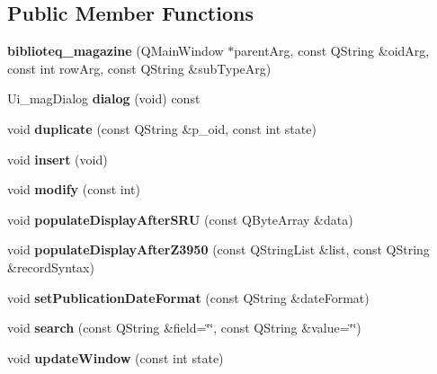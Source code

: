 \subsection*{Public Member Functions}
\begin{DoxyCompactItemize}
\item 
{\bfseries biblioteq\+\_\+magazine} (Q\+Main\+Window $\ast$parent\+Arg, const Q\+String \&oid\+Arg, const int row\+Arg, const Q\+String \&sub\+Type\+Arg)\hypertarget{classbiblioteq__magazine_ad28113019caa57b7ee667a82516b7bef}{}\label{classbiblioteq__magazine_ad28113019caa57b7ee667a82516b7bef}

\item 
Ui\+\_\+mag\+Dialog {\bfseries dialog} (void) const \hypertarget{classbiblioteq__magazine_aefc3cf7d5dc6f2af91040d8ba681b6f3}{}\label{classbiblioteq__magazine_aefc3cf7d5dc6f2af91040d8ba681b6f3}

\item 
void {\bfseries duplicate} (const Q\+String \&p\+\_\+oid, const int state)\hypertarget{classbiblioteq__magazine_ac02b6ebcb65686082f8fb3ffa411288d}{}\label{classbiblioteq__magazine_ac02b6ebcb65686082f8fb3ffa411288d}

\item 
void {\bfseries insert} (void)\hypertarget{classbiblioteq__magazine_a28d4da5cc33f6ac02373b85dfe4240b7}{}\label{classbiblioteq__magazine_a28d4da5cc33f6ac02373b85dfe4240b7}

\item 
void {\bfseries modify} (const int)\hypertarget{classbiblioteq__magazine_a5a542d604cf17ca39bca7de932ffa248}{}\label{classbiblioteq__magazine_a5a542d604cf17ca39bca7de932ffa248}

\item 
void {\bfseries populate\+Display\+After\+S\+RU} (const Q\+Byte\+Array \&data)\hypertarget{classbiblioteq__magazine_a1140e43db1cad46da869287e29a2b523}{}\label{classbiblioteq__magazine_a1140e43db1cad46da869287e29a2b523}

\item 
void {\bfseries populate\+Display\+After\+Z3950} (const Q\+String\+List \&list, const Q\+String \&record\+Syntax)\hypertarget{classbiblioteq__magazine_a4bd4c1cb752ec7b0eab449e83a21056d}{}\label{classbiblioteq__magazine_a4bd4c1cb752ec7b0eab449e83a21056d}

\item 
void {\bfseries set\+Publication\+Date\+Format} (const Q\+String \&date\+Format)\hypertarget{classbiblioteq__magazine_aa7add0d8bcdf55402817d3d8be6e09c7}{}\label{classbiblioteq__magazine_aa7add0d8bcdf55402817d3d8be6e09c7}

\item 
void {\bfseries search} (const Q\+String \&field=\char`\"{}\char`\"{}, const Q\+String \&value=\char`\"{}\char`\"{})\hypertarget{classbiblioteq__magazine_af39a2b84bc3ee9d108812a9df2137bfc}{}\label{classbiblioteq__magazine_af39a2b84bc3ee9d108812a9df2137bfc}

\item 
void {\bfseries update\+Window} (const int state)\hypertarget{classbiblioteq__magazine_a5645500bca3c8cc4360ec1b75f1abd5b}{}\label{classbiblioteq__magazine_a5645500bca3c8cc4360ec1b75f1abd5b}

\end{DoxyCompactItemize}
